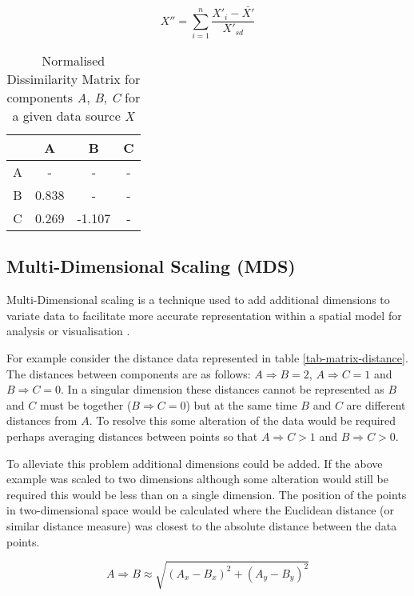 \begin{equation}
\label{eq-matrix-normdissimilarity}
\displaystyle X'' = \sum\limits_{i=1}^n \frac{X'_i - \bar{X'}}{X'_{sd}}
\end{equation}

\begin{table}[H]
\centering
\begin{tabular}{| c || c | c | c |}
\hline
 & A & B & C \\ \hline \hline
A & - & - & - \\
B & 0.838 & - & - \\ 
C & 0.269 & -1.107 & - \\ 
\hline
\end{tabular}
\caption{Normalised Dissimilarity Matrix for components \textit{A}, \textit{B}, \textit{C} for a given data source \textit{X}}
\label{tab-matrix-normdissimilarity}
\end{table}

\subsection{Multi-Dimensional Scaling (MDS)}

Multi-Dimensional scaling is a technique used to add additional dimensions to variate data to facilitate more accurate representation within a spatial model for analysis or visualisation \citep{pilch_diss_pich_2009}.

For example consider the distance data represented in table \ref{tab-matrix-distance}. The distances between components are as follows: $A \Rightarrow B = 2$, $A \Rightarrow C = 1$ and $B \Rightarrow C = 0$. In a singular dimension these distances cannot be represented as $B$ and $C$ must be together ($B \Rightarrow C = 0$) but at the same time $B$ and $C$ are different distances from $A$. To resolve this some alteration of the data would be required perhaps averaging distances between points so that $A \Rightarrow C > 1$ and $B \Rightarrow C > 0$.

To alleviate this problem additional dimensions could be added. If the above example was scaled to two dimensions although some alteration would still be required this would be less than on a single dimension. The position of the points in two-dimensional space would be calculated where the Euclidean distance (or similar distance measure) was closest to the absolute distance between the data points.

\begin{equation}
\label{eq-mds-euclid}
\displaystyle A \Rightarrow B \approx \sqrt{(A_x - B_x)^2 + (A_y - B_y)^2}
\end{equation}

